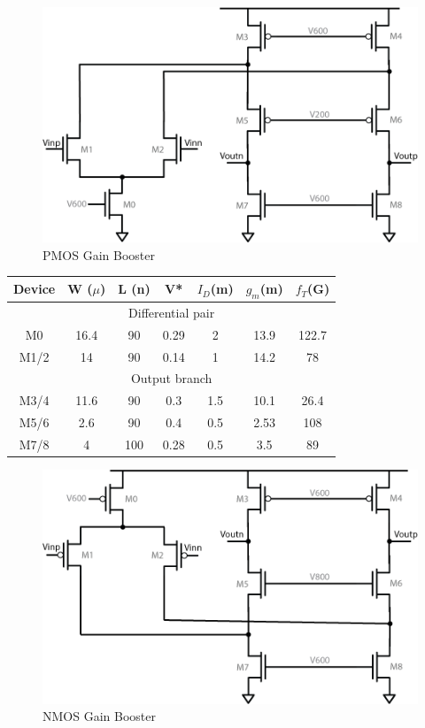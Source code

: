 \documentclass[conference]{IEEEtran}
\begin{document}
\begin{figure}[h]
\centering
\includegraphics[width=0.75\linewidth]{illus/pmos_boost}
\caption{PMOS Gain Booster}
\label{fig:pmos_boost}
\end{figure}

\begin{center}
\begin{tabular}{|c|c|c|c|c|c|c|} 
\hline
Device & W ($\mu$) & L (n) & V* & $I_D$(m) & $g_m$(m) & $f_T$(G) \\
\hline
\multicolumn{7}{|c|}{Differential pair} \\
\hline
M0 &	 16.4 & 90 & 0.29 & 2 & 13.9 & 122.7 \\
\hline
M1/2 &  14 & 90 & 0.14 & 1 & 14.2 & 78 \\
\hline
\multicolumn{7}{|c|}{Output branch} \\
\hline
M3/4 & 11.6 & 90 & 0.3 & 1.5 & 10.1 & 26.4 \\
\hline
M5/6 & 2.6 & 90 & 0.4 & 0.5 & 2.53 & 108 \\
\hline
M7/8 & 4 & 100 & 0.28 & 0.5 & 3.5 & 89 \\
\hline
\end{tabular}
\end{center}


\begin{figure}[h]
\centering
\includegraphics[width=0.75\linewidth]{illus/nmos_boost}
\caption{NMOS Gain Booster}
\label{fig:nmos_boost}
\end{figure}
\end{document}

